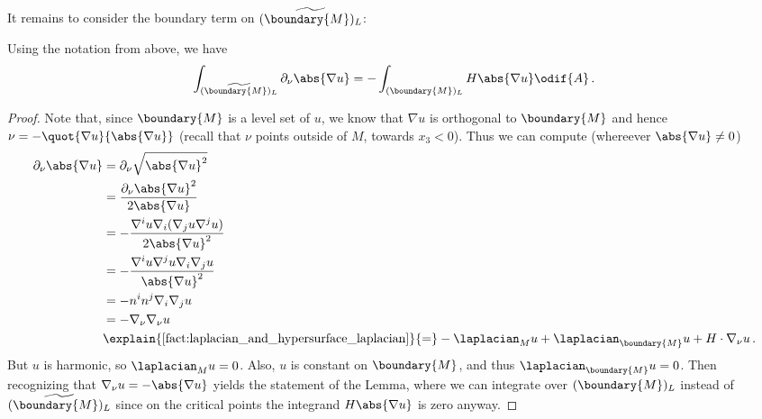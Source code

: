 \documentclass[titlepage,numbers=noenddot,oneside,%
cleardoublepage=empty,paper=a4,fontsize=11pt,%
english,%
]{scrartcl}
\newcommand*{\mathfullstop}{\,.}
\begin{document}
It remains to consider the boundary term on \( \widetilde{(\boundary{M})_L} \):
\begin{lemma}\label{lem:half_space_boundary_boundary_term}
    Using the notation from above, we have
    \begin{equation*}
        \int_{\widetilde{(\boundary{M})_L}} \partial_\nu \abs{\nabla u}=-\int_{ (\boundary{M})_L}H\abs{\nabla u}\odif{A}\mathfullstop
    \end{equation*}
\end{lemma}
\begin{proof}
    Note that, since \( \boundary{M} \) is a level set of \( u \), we know that \( \nabla u \) is orthogonal to \( \boundary{M} \) and hence \( \nu=-\quot{\nabla u}{\abs{\nabla u}} \) (recall that \( \nu \) points outside of \( M \), \ie towards \( x_3<0 \)). Thus we can compute (whereever \( \abs{\nabla u}\neq 0 \))
    \begin{equation*}
        \begin{aligned}[t]
            \partial_{\nu}\abs{\nabla u}&=\partial_{\nu} \sqrt{\abs{\nabla u}^2}\\
            &=\frac{\partial_{\nu} \abs{\nabla u}^2}{2\abs{\nabla u}}\\
            &=-\frac{\nabla^i u \nabla_i(\nabla_j u \nabla^j u)}{2\abs{\nabla u}^2}\\
            &=-\frac{\nabla^i u \nabla^j u \nabla_i \nabla_j u}{\abs{\nabla u}^2}\\
            &=-n^i n^j \nabla_i \nabla_j u\\
            &=-\nabla_{\nu}\nabla_{\nu} u\\
            &\explain{\text{\cref{fact:laplacian_and_hypersurface_laplacian}}}{=}-\laplacian_M u+\laplacian_{\boundary{M}} u +H\cdot \nabla_{\nu} u\mathfullstop
        \end{aligned}
    \end{equation*}
    But \( u \) is harmonic, so \( \laplacian_M u=0 \). Also, \( u \) is constant on \( \boundary{M} \), and thus \( \laplacian_{\boundary{M}}u=0 \). Then recognizing that \( \nabla_{\nu} u=-\abs{\nabla u} \) yields the statement of the Lemma, where we can integrate over \(  (\boundary{M})_L \) instead of \( \widetilde{(\boundary{M})_L} \) since on the critical points the integrand \( H\abs{\nabla u} \) is zero anyway.
\end{proof}
\end{document}
